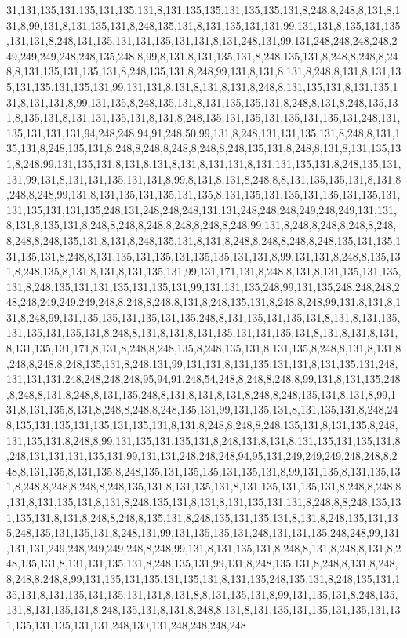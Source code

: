 31,131,135,131,135,131,135,131,8,131,135,135,131,135,135,131,8,248,8,248,8,131,8,131,8,99,131,8,131,135,131,8,248,135,131,8,131,135,131,131,99,131,131,8,135,131,135,131,131,8,248,131,135,131,131,135,131,131,8,131,248,131,99,131,248,248,248,248,249,249,249,248,248,135,248,8,99,8,131,8,131,135,131,8,248,135,131,8,248,8,248,8,248,8,131,135,131,135,131,8,248,135,131,8,248,99,131,8,131,8,131,8,248,8,131,8,131,135,131,135,131,135,131,99,131,131,8,131,8,131,8,131,8,248,8,131,135,131,8,131,135,131,8,131,131,8,99,131,135,8,248,135,131,8,131,135,135,131,8,248,8,131,8,248,135,131,8,135,131,8,131,131,135,131,8,131,8,248,135,131,135,131,135,131,135,131,248,131,135,131,131,131,94,248,248,94,91,248,50,99,131,8,248,131,131,135,131,8,248,8,131,135,131,8,248,135,131,8,248,8,248,8,248,8,248,8,248,135,131,8,248,8,131,8,131,135,131,8,248,99,131,135,131,8,131,8,131,8,131,8,131,131,8,131,131,135,131,8,248,135,131,131,99,131,8,131,131,135,131,131,8,99,8,131,8,131,8,248,8,8,131,135,135,131,8,131,8,248,8,248,99,131,8,131,135,131,135,131,135,8,131,135,131,135,131,135,131,135,131,131,135,131,131,135,248,131,248,248,248,131,131,248,248,248,249,248,249,131,131,8,131,8,135,131,8,248,8,248,8,248,8,248,8,248,8,248,99,131,8,248,8,248,8,248,8,248,8,248,8,248,135,131,8,131,8,248,135,131,8,131,8,248,8,248,8,248,8,248,135,131,135,131,135,131,8,248,8,131,135,131,135,131,135,135,131,131,8,99,131,131,8,248,8,135,131,8,248,135,8,131,8,131,8,131,135,131,99,131,171,131,8,248,8,131,8,131,135,131,135,131,8,248,135,131,131,135,131,135,131,99,131,131,135,248,99,131,135,248,248,248,248,248,249,249,249,248,8,248,8,248,8,131,8,248,135,131,8,248,8,248,99,131,8,131,8,131,8,248,99,131,135,135,131,135,131,135,248,8,131,135,131,135,131,8,131,8,131,135,131,135,131,135,131,8,248,8,131,8,131,8,131,135,131,131,135,131,8,131,8,131,8,131,8,131,135,131,171,8,131,8,248,8,248,135,8,248,135,131,8,131,135,8,248,8,131,8,131,8,248,8,248,8,248,135,131,8,248,131,99,131,131,8,131,135,131,131,8,131,135,131,248,131,131,131,248,248,248,248,95,94,91,248,54,248,8,248,8,248,8,99,131,8,131,135,248,8,248,8,131,8,248,8,131,135,248,8,131,8,131,8,131,8,248,8,248,135,131,8,131,8,99,131,8,131,135,8,131,8,248,8,248,8,248,135,131,99,131,135,131,8,131,135,131,8,248,248,135,131,135,131,135,131,135,131,8,131,8,248,8,248,8,248,135,131,8,131,135,8,248,131,135,131,8,248,8,99,131,135,131,135,131,8,248,131,8,131,8,131,135,131,135,131,8,248,131,131,131,135,131,99,131,131,248,248,248,94,95,131,249,249,249,248,248,8,248,8,131,135,8,131,135,8,248,135,131,135,135,131,135,131,8,99,131,135,8,131,135,131,8,248,8,248,8,248,8,248,135,131,8,131,135,131,8,131,135,131,135,131,8,248,8,248,8,131,8,131,135,131,8,131,8,248,135,131,8,131,8,131,135,131,131,8,248,8,8,248,135,131,135,131,8,131,8,248,8,248,8,135,131,8,248,135,131,135,131,8,131,8,248,135,131,135,248,135,131,135,131,8,248,131,99,131,135,135,131,248,131,131,135,248,248,99,131,131,131,249,248,249,249,248,8,248,99,131,8,131,135,131,8,248,8,131,8,248,8,131,8,248,135,131,8,131,131,135,131,8,248,135,131,99,131,8,248,135,131,8,248,8,131,8,248,8,248,8,248,8,99,131,135,131,135,131,135,131,8,131,135,248,135,131,8,248,135,131,135,131,8,131,135,131,135,131,131,8,131,8,8,131,135,131,8,99,131,135,131,8,248,135,131,8,131,135,131,8,248,135,131,8,131,8,248,8,131,8,131,135,131,135,131,135,131,131,135,131,135,131,131,248,130,131,248,248,248,248